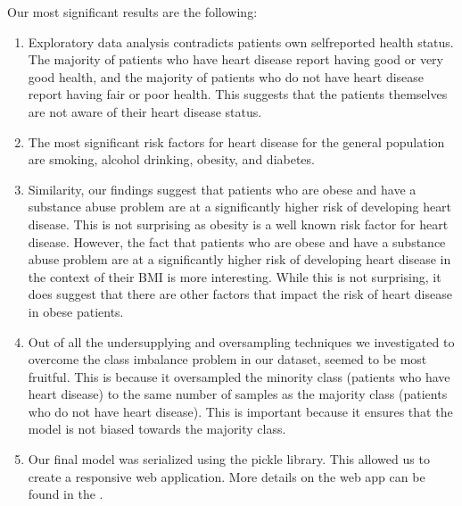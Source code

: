 \documentclass[letterpaper,10pt,english]{jupyterBook}
\begin{document}
\sphinxAtStartPar
Our most significant results are the following:
\begin{enumerate}
%
\item {} 
\sphinxAtStartPar
Exploratory data analysis contradicts  patients own self\sphinxhyphen{}reported health status. The majority of patients who have heart disease report having good or very good health, and the majority of patients who do not have heart disease report having fair or poor health. This suggests that the patients themselves are not aware of their heart disease status.

\item {} 
\sphinxAtStartPar
The most significant risk factors for heart disease for the general population are smoking, alcohol drinking, obesity, and diabetes.

\item {} 
\sphinxAtStartPar
Similarity, our findings suggest that patients who are obese and have a substance abuse problem are at a significantly higher risk of developing heart disease. This is not surprising as obesity is a well known risk factor for heart disease. However, the fact that patients who are obese and have a substance abuse problem are at a significantly higher risk of developing heart disease in the context of their BMI is more interesting. While this is not surprising, it does suggest that there are other factors that impact the risk of heart disease in obese patients.

\item {} 
\sphinxAtStartPar
Out of all the undersupplying and oversampling techniques we investigated to overcome the class imbalance problem in our dataset,  seemed to be most fruitful. This is because it oversampled the minority class (patients who have heart disease) to the same number of samples as the majority class (patients who do not have heart disease). This is important because it ensures that the model is not biased towards the majority class.

\item {} 
\sphinxAtStartPar
Our final model was serialized using the  pickle library. This allowed us to create a responsive web application. More details on the web app can be found in the .

\end{enumerate}
\end{document}
